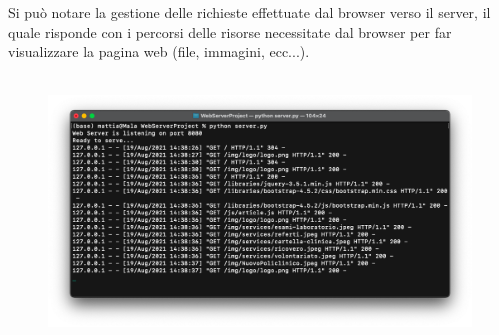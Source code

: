 \documentclass[a4paper,12pt]{report}
\begin{document}
Si può notare la gestione delle richieste effettuate dal browser verso il server, il quale risponde con i percorsi delle risorse necessitate dal browser per far visualizzare la pagina web (file, immagini, ecc...).
\\
\\
\begin{figure}[ht]
    \begin{center}
        \centering
        \includegraphics[width=\textwidth]{img/Terminale2.png}
    \end{center}
\end{figure}
\end{document}
